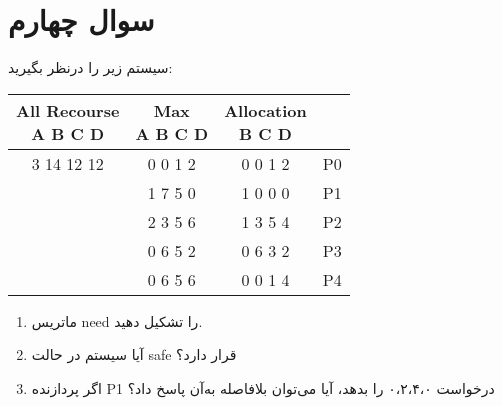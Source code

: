 \section{سوال چهارم}

سیستم زیر را درنظر بگیرید:

\begin{latin}
	\begin{center}
		\begin{tabular}{||c| c c |c||} 
			\hline
			\thead{All Recourse\\ A B C D} & \thead{Max\\ A B C D} & \thead{Allocation\\ B C D} &  \\ [0.5ex] 
			\hline\hline
			3 14 12 12 & 0 0 1 2 & 0 0 1 2 & P0 \\ 

			 & 1 7 5 0 & 1 0 0 0 & P1 \\

			 & 2 3 5 6 & 1 3 5 4 & P2 \\

			 & 0 6 5 2 & 0 6 3 2 & P3 \\

			 & 0 6 5 6 & 0 0 1 4 & P4 \\ [1ex] 
			\hline
		\end{tabular}
	\end{center}
\end{latin}




\begin{enumerate}
	\item ماتریس need را تشکیل دهید.
	\item آیا سیستم در حالت safe قرار دارد؟
	\item اگر پردازنده P1 درخواست ۰،۲،۴،۰ را بدهد، آیا می‌توان بلافاصله به‌آن پاسخ داد؟
\end{enumerate}




